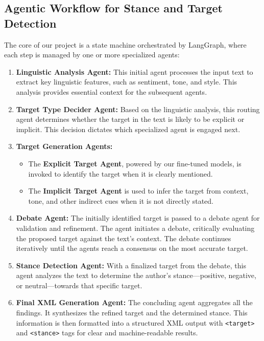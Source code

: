 \documentclass{article}
\begin{document}
\subsection{Agentic Workflow for Stance and Target Detection}
The core of our project is a state machine orchestrated by LangGraph, where each step is managed by one or more specialized agents:

\begin{enumerate}
    \item \textbf{Linguistic Analysis Agent:} This initial agent processes the input text to extract key linguistic features, such as sentiment, tone, and style. This analysis provides essential context for the subsequent agents.

    \item \textbf{Target Type Decider Agent:} Based on the linguistic analysis, this routing agent determines whether the target in the text is likely to be explicit or implicit. This decision dictates which specialized agent is engaged next.

    \item \textbf{Target Generation Agents:}
    \begin{itemize}
        \item The \textbf{Explicit Target Agent}, powered by our fine-tuned models, is invoked to identify the target when it is clearly mentioned.
        \item The \textbf{Implicit Target Agent} is used to infer the target from context, tone, and other indirect cues when it is not directly stated.
    \end{itemize}

    \item \textbf{Debate Agent:} The initially identified target is passed to a debate agent for validation and refinement. The agent initiates a debate, critically evaluating the proposed target against the text's context. The debate continues iteratively until the agents reach a consensus on the most accurate target.

    \item \textbf{Stance Detection Agent:} With a finalized target from the debate, this agent analyzes the text to determine the author's stance—positive, negative, or neutral—towards that specific target.

    \item \textbf{Final XML Generation Agent:} The concluding agent aggregates all the findings. It synthesizes the refined target and the determined stance. This information is then formatted into a structured XML output with \texttt{<target>} and \texttt{<stance>} tags for clear and machine-readable results.
\end{enumerate}
\end{document}
